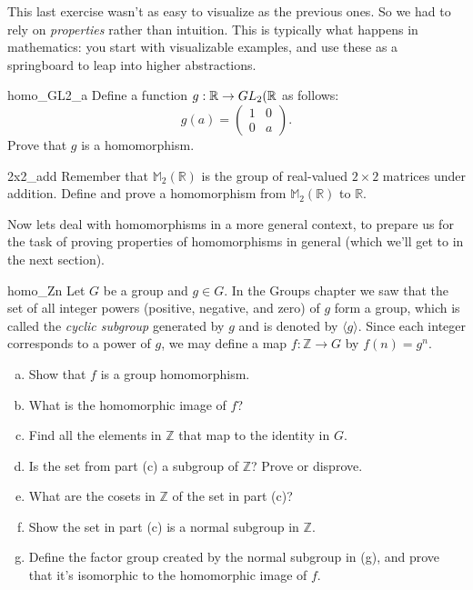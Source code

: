 \begin{rem}
This last exercise wasn't as easy to visualize as the previous ones.  So we had to rely on \emph{properties} rather than intuition. This is typically what happens in mathematics: you start with visualizable examples, and use these as a springboard to leap into higher abstractions.
\end{rem}

\begin{exercise}{homo_GL2_a}
Define a function $g: \mathbb{R} \rightarrow GL_2( {\mathbb R }$ as follows:
\[
g(a) = \left(
\begin{array}{cc}
1 & 0 \\
0 & a
\end{array}
\right).
\]
Prove that $g$ is a homomorphism.
\end{exercise}

\begin{exercise}{2x2_add}
Remember that  ${\mathbb M}_2( {\mathbb R})$ is the group of real-valued $2 \times 2$ matrices under addition.  Define and prove a homomorphism from ${\mathbb M}_2( {\mathbb R})$ to ${\mathbb R}$.
\end{exercise}

Now lets deal with homomorphisms in a more general context, to prepare us for the task of proving  properties of homomorphisms in general (which we'll get to in the next section).
 
\begin{exercise}{homo_Zn}
Let $G$ be a group and $g \in G$. In the Groups chapter we saw that the set of all integer powers (positive, negative, and zero) of $g$ form a group, which is called the
\emph{cyclic subgroup} generated by $g$ and is denoted by $\langle g \rangle$. 
Since each integer corresponds to a power of $g$, we may define a map $f : {\mathbb Z}
\rightarrow G$ by $f( n ) = g^n$. 
\begin{enumerate}[(a)]
\item
Show that $f$ is a group
homomorphism.
\item 
What is the homomorphic image of $f$?
\item
Find all the elements in ${\mathbb Z}$ that map  to the identity in $G$.
\item
Is the set from part (c) a subgroup of ${\mathbb Z}$?  Prove or disprove.
\item
What are the cosets in ${\mathbb Z}$ of the set in part (c)?
\item
Show the set in part (c) is a normal subgroup in ${\mathbb Z}$.
\item
Define the factor group created by the normal subgroup in (g), and prove that it's isomorphic to  the homomorphic image of $f$.
\end{enumerate}
\end{exercise}


